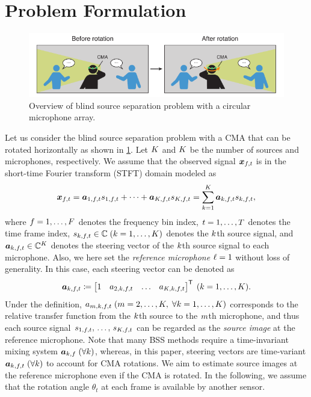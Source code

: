 \documentclass[sip,biber]{now-journal}
\begin{document}
\section{Problem Formulation}\label{sec:problem}
\begin{figure}[t]
  \centering
  \includegraphics{figures/diagrams/bss.pdf}%
  \caption{Overview of blind source separation problem with a circular microphone array.}%
  \label{fig:bss}
\end{figure}
Let us consider the blind source separation problem with a CMA that can be rotated horizontally as shown in \cref{fig:bss}.
Let $K$ and $K$ be the number of sources and microphones, respectively.
We assume that the observed signal $\Obs _{\ft}$ is in the short-time Fourier transform (STFT) domain modeled as
\begin{equation}
  \Obs _{\ft} = \steer _{1,\ft} \sig _{1,\ft} + \dots + \steer _{\Src,\ft} \sig _{\Src,\ft} = \sum _{\src=1} ^{\Src} \steer _{\src,\ft} \sig _{\src,\ft},\label{eq:mix}
\end{equation}
where $f = 1, \dots, F$ denotes the frequency bin index,
$t = 1, \dots, T$ denotes the time frame index,
$\sig _{\src,\ft} \in \C\; (\src = 1, \dots, \Src)$ denotes the $k$th source signal,
and $\steer _{\src,\ft} \in \C ^{\Mic}$ denotes the steering vector of the $k$th source signal to each microphone.
Also, we here set the \emph{reference microphone} $\ell = 1$ without loss of generality.
In this case, each steering vector can be denoted as
\begin{equation}
  \steer _{\src,\ft} \coloneqq \begin{bmatrix} 1 & \str _{2,\src,\ft} & \dots & \str _{\Mic,\src,\ft} \end{bmatrix} ^{\top}\; (\src = 1, \dots, \Src).
\end{equation}
Under the definition, $\str _{\mic,\src,\ft} \; (\mic = 2, \dots, \Mic,\; \forall \src = 1, \dots, \Src)$ corresponds to the relative transfer function from the $k$th source to the $m$th microphone, and thus each source signal $\sig _{1,\ft},\, \dots,\, \sig _{\Src,\ft}$ can be regarded as the \emph{source image} at the reference microphone.
Note that many BSS methods require a time-invariant mixing system $\bm{a} _{k,f}\; (\forall k)$,
whereas, in this paper, steering vectors are time-variant $\steer _{\src,\ft}\; (\forall \src)$ to account for CMA rotations.
We aim to estimate source images at the reference microphone even if the CMA is rotated.
In the following, we assume that the rotation angle $\theta_t$ at each frame is available by another sensor.
\end{document}
